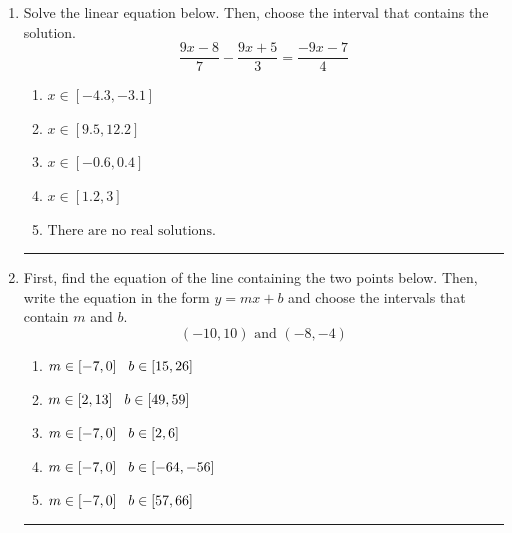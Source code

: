 \documentclass[14pt]{extbook}
\newcommand{\litem}[1]{\item#1\hspace*{-1cm}\rule{\textwidth}{0.4pt}}
\begin{document}
\begin{enumerate}
{\begin{enumerate}[label=\Alph*.]
\end{enumerate} }
\litem{
Solve the linear equation below. Then, choose the interval that contains the solution.\[ \frac{9x -8}{7} - \frac{9x + 5}{3} = \frac{-9x -7}{4} \]\begin{enumerate}[label=\Alph*.]
\item \( x \in [-4.3, -3.1] \)
\item \( x \in [9.5, 12.2] \)
\item \( x \in [-0.6, 0.4] \)
\item \( x \in [1.2, 3] \)
\item \( \text{There are no real solutions.} \)

\end{enumerate} }
\litem{
First, find the equation of the line containing the two points below. Then, write the equation in the form $ y=mx+b $ and choose the intervals that contain $m$ and $b$.\[ (-10, 10) \text{ and } (-8, -4) \]\begin{enumerate}[label=\Alph*.]
\item \( m \in [-7, 0] \hspace*{3mm} b \in [15, 26] \)
\item \( m \in [2, 13] \hspace*{3mm} b \in [49, 59] \)
\item \( m \in [-7, 0] \hspace*{3mm} b \in [2, 6] \)
\item \( m \in [-7, 0] \hspace*{3mm} b \in [-64, -56] \)
\item \( m \in [-7, 0] \hspace*{3mm} b \in [57, 66] \)


\end{enumerate}}
\end{enumerate}
\end{document}
